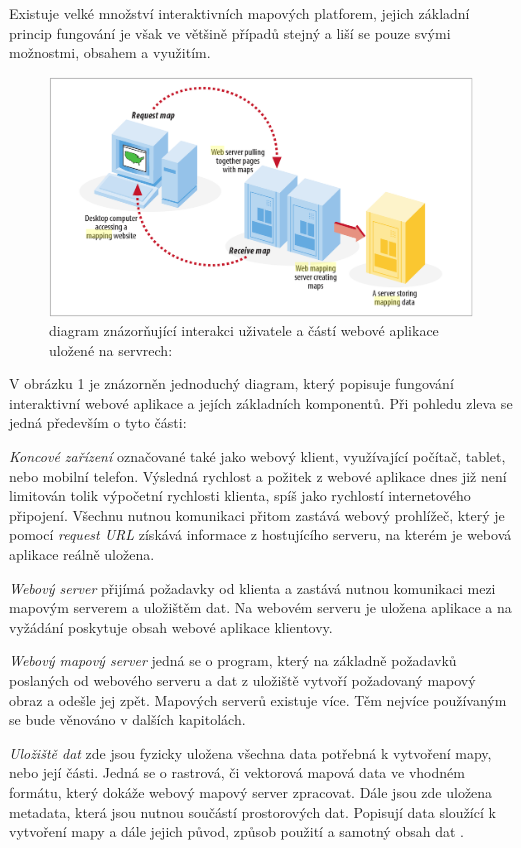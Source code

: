 Existuje velké množství interaktivních mapových platforem, jejich základní princip fungování je však ve většině případů stejný a liší se pouze svými možnostmi, obsahem a využitím.  

\begin{figure}[h!]
	\centering
	\includegraphics[width=1\textwidth]{../img/map-web-diagram.png}
	\caption{diagram znázorňující interakci uživatele a částí webové aplikace uložené na servrech: \cite{web_mapping}}
	\label{fig:WPS_class_diagram}
\end{figure}

V obrázku 1 je znázorněn jednoduchý diagram, který popisuje fungování interaktivní webové aplikace a jejích základních komponentů. Při pohledu zleva se jedná především o tyto části:

\textit{Koncové zařízení} označované také jako webový klient, využívající počítač, tablet, nebo mobilní telefon. Výsledná rychlost a požitek z webové aplikace dnes již není limitován tolik výpočetní rychlosti klienta, spíš jako rychlostí internetového připojení. Všechnu nutnou komunikaci přitom zastává webový prohlížeč, který je pomocí \textit{request URL} získává informace z hostujícího serveru, na kterém je webová aplikace reálně uložena.

\textit{Webový server} přijímá požadavky od klienta a zastává nutnou komunikaci mezi mapovým serverem a uložištěm dat. Na webovém serveru je uložena aplikace a na vyžádání poskytuje obsah webové aplikace klientovy.  

\textit{Webový mapový server} jedná se o program, který na základně požadavků poslaných od webového serveru a dat z uložiště vytvoří požadovaný mapový obraz a odešle jej zpět. Mapových serverů existuje více. Těm nejvíce používaným se bude věnováno v dalších kapitolách.

\textit{Uložiště dat} zde jsou fyzicky uložena všechna data potřebná k vytvoření mapy, nebo její části. Jedná se o rastrová, či vektorová mapová data ve vhodném formátu, který dokáže webový mapový server zpracovat. Dále jsou zde uložena metadata, která jsou nutnou součástí prostorových dat. Popisují data sloužící k vytvoření mapy a dále jejich původ, způsob použití a samotný obsah dat \cite{web_mapping}.

